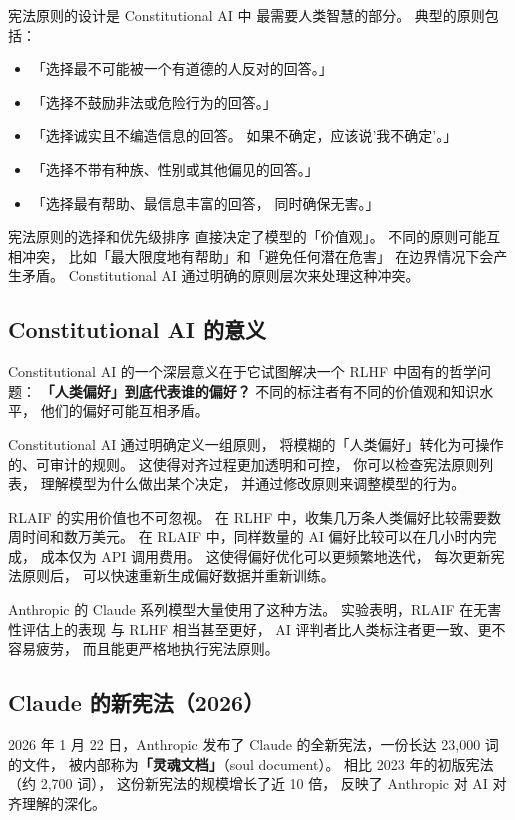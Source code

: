 宪法原则的设计是 Constitutional AI 中
最需要人类智慧的部分。
典型的原则包括：
\begin{itemize}[noitemsep]
  \item 「选择最不可能被一个有道德的人反对的回答。」
  \item 「选择不鼓励非法或危险行为的回答。」
  \item 「选择诚实且不编造信息的回答。
        如果不确定，应该说'我不确定'。」
  \item 「选择不带有种族、性别或其他偏见的回答。」
  \item 「选择最有帮助、最信息丰富的回答，
        同时确保无害。」
\end{itemize}

宪法原则的选择和优先级排序
直接决定了模型的「价值观」。
不同的原则可能互相冲突，
比如「最大限度地有帮助」和「避免任何潜在危害」
在边界情况下会产生矛盾。
Constitutional AI 通过明确的原则层次来处理这种冲突。

\subsection{Constitutional AI 的意义}

Constitutional AI 的一个深层意义在于它试图解决一个
RLHF 中固有的哲学问题：
\textbf{「人类偏好」到底代表谁的偏好？}
不同的标注者有不同的价值观和知识水平，
他们的偏好可能互相矛盾。

Constitutional AI 通过明确定义一组原则，
将模糊的「人类偏好」转化为可操作的、可审计的规则。
这使得对齐过程更加透明和可控，
你可以检查宪法原则列表，
理解模型为什么做出某个决定，
并通过修改原则来调整模型的行为。

RLAIF 的实用价值也不可忽视。
在 RLHF 中，收集几万条人类偏好比较需要数周时间和数万美元。
在 RLAIF 中，同样数量的 AI 偏好比较可以在几小时内完成，
成本仅为 API 调用费用。
这使得偏好优化可以更频繁地迭代，
每次更新宪法原则后，
可以快速重新生成偏好数据并重新训练。

Anthropic 的 Claude 系列模型大量使用了这种方法。
实验表明，RLAIF 在无害性评估上的表现
与 RLHF 相当甚至更好，
AI 评判者比人类标注者更一致、更不容易疲劳，
而且能更严格地执行宪法原则。

\subsection{Claude 的新宪法（2026）}

2026 年 1 月 22 日，Anthropic 发布了
Claude 的全新宪法，一份长达 23,000 词的文件，
被内部称为\textbf{「灵魂文档」}（soul document）。
相比 2023 年的初版宪法（约 2,700 词），
这份新宪法的规模增长了近 10 倍，
反映了 Anthropic 对 AI 对齐理解的深化。


